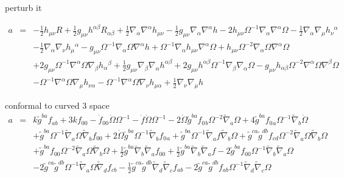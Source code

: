 \documentclass[10pt,letterpaper]{article}
\numberwithin{equation}{section}
\begin{document}
perturb it

\begin{eqnarray}
a&=& - \tfrac{1}{2} h_{\mu \nu } R + \tfrac{1}{2} g_{\mu \nu } h^{\alpha \beta } R_{\alpha \beta } + \tfrac{1}{2} \nabla_{\alpha }\nabla^{\alpha }h_{\mu \nu } -  \tfrac{1}{2} g_{\mu \nu } \nabla_{\alpha }\nabla^{\alpha }h - 2 h_{\mu \nu } \Omega^{-1} \nabla_{\alpha }\nabla^{\alpha }\Omega -  \tfrac{1}{2} \nabla_{\alpha }\nabla_{\mu }h_{\nu }{}^{\alpha } \nonumber \\ 
&& -  \tfrac{1}{2} \nabla_{\alpha }\nabla_{\nu }h_{\mu }{}^{\alpha } -  g_{\mu \nu } \Omega^{-1} \nabla_{\alpha }\Omega \nabla^{\alpha }h + \Omega^{-1} \nabla_{\alpha }h_{\mu \nu } \nabla^{\alpha }\Omega + h_{\mu \nu } \Omega^{-2} \nabla_{\alpha }\Omega \nabla^{\alpha }\Omega \nonumber \\ 
&& + 2 g_{\mu \nu } \Omega^{-1} \nabla^{\alpha }\Omega \nabla_{\beta }h_{\alpha }{}^{\beta } + \tfrac{1}{2} g_{\mu \nu } \nabla_{\beta }\nabla_{\alpha }h^{\alpha \beta } + 2 g_{\mu \nu } h^{\alpha \beta } \Omega^{-1} \nabla_{\beta }\nabla_{\alpha }\Omega -  g_{\mu \nu } h_{\alpha \beta } \Omega^{-2} \nabla^{\alpha }\Omega \nabla^{\beta }\Omega \nonumber \\ 
&& -  \Omega^{-1} \nabla^{\alpha }\Omega \nabla_{\mu }h_{\nu \alpha } -  \Omega^{-1} \nabla^{\alpha }\Omega \nabla_{\nu }h_{\mu \alpha } + \tfrac{1}{2} \nabla_{\nu }\nabla_{\mu }h
\end{eqnarray}

conformal to curved 3 space
\begin{eqnarray}
a&=& k \tilde{g}^{ba} f_{ab} + 3 k f_{00}{} -  \dot{f}_{00}{} \dot{\Omega} \Omega^{-1} -  \dot{f} \dot{\Omega} \Omega^{-1} - 2 \dot{\Omega} \tilde{g}^{ba} f_{0}{}_{b} \Omega^{-2} \tilde{\nabla}_{a}\Omega + 4 \tilde{g}^{ba} f_{0}{}_{a} \Omega^{-1} \tilde{\nabla}_{b}\dot{\Omega} \nonumber \\ 
&& + \tilde{g}^{ba} \Omega^{-1} \tilde{\nabla}_{a}\Omega \tilde{\nabla}_{b}f_{00}{} + 2 \dot{\Omega} \tilde{g}^{ba} \Omega^{-1} \tilde{\nabla}_{b}f_{0}{}_{a} + \tilde{g}^{ba} \Omega^{-1} \tilde{\nabla}_{a}f \tilde{\nabla}_{b}\Omega + \tilde{g}^{ca} \tilde{g}^{db} f_{cd} \Omega^{-2} \tilde{\nabla}_{a}\Omega \tilde{\nabla}_{b}\Omega \nonumber \\ 
&& + \tilde{g}^{ba} f_{00}{} \Omega^{-2} \tilde{\nabla}_{a}\Omega \tilde{\nabla}_{b}\Omega + \tfrac{1}{2} \tilde{g}^{ba} \tilde{\nabla}_{b}\tilde{\nabla}_{a}f_{00}{} + \tfrac{1}{2} \tilde{g}^{ba} \tilde{\nabla}_{b}\tilde{\nabla}_{a}f - 2 \tilde{g}^{ba} f_{00}{} \Omega^{-1} \tilde{\nabla}_{b}\tilde{\nabla}_{a}\Omega \nonumber \\ 
&& - 2 \tilde{g}^{ca} \tilde{g}^{db} \Omega^{-1} \tilde{\nabla}_{a}\Omega \tilde{\nabla}_{d}f_{cb} -  \tfrac{1}{2} \tilde{g}^{ca} \tilde{g}^{db} \tilde{\nabla}_{d}\tilde{\nabla}_{c}f_{ab} - 2 \tilde{g}^{ca} \tilde{g}^{db} f_{ab} \Omega^{-1} \tilde{\nabla}_{d}\tilde{\nabla}_{c}\Omega 
\end{eqnarray}
\end{document}

